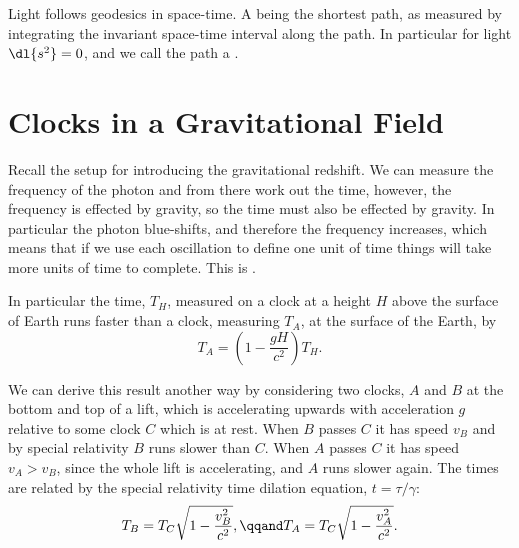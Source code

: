 \documentclass[fleqn]{NotesClass}
\begin{document}
    Light follows geodesics in space-time.
    A  being the shortest path, as measured by integrating the invariant space-time interval along the path.
    In particular for light \(\dl{s^2} = 0\), and we call the path a .
    
    \section{Clocks in a Gravitational Field}
    Recall the setup for introducing the gravitational redshift.
    We can measure the frequency of the photon and from there work out the time, however, the frequency is effected by gravity, so the time must also be effected by gravity.
    In particular the photon blue-shifts, and therefore the frequency increases, which means that if we use each oscillation to define one unit of time things will take more units of time to complete.
    This is .
    
    In particular the time, \(T_H\), measured on a clock at a height \(H\) above the surface of Earth runs faster than a clock, measuring \(T_A\), at the surface of the Earth, by
    \begin{equation}
        T_A = \left( 1 - \frac{gH}{c^2} \right)T_H.
    \end{equation}
    
    We can derive this result another way by considering two clocks, \(A\) and \(B\) at the bottom and top of a lift, which is accelerating upwards with acceleration \(g\) relative to some clock \(C\) which is at rest.
    When \(B\) passes \(C\) it has speed \(v_B\) and by special relativity \(B\) runs slower than \(C\).
    When \(A\) passes \(C\) it has speed \(v_A > v_B\), since the whole lift is accelerating, and \(A\) runs slower again.
    The times are related by the special relativity time dilation equation, \(t = \tau/\gamma\):
    \begin{equation}
        T_B = T_C\sqrt{1 - \frac{v_B^2}{c^2}}, \qqand T_A = T_C \sqrt{1 - \frac{v_A^2}{c^2}}.
    \end{equation}
    
\end{document}
